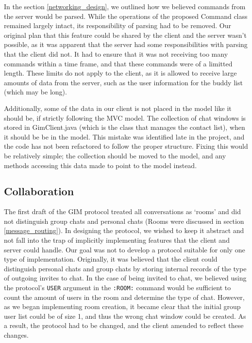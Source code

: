 In the section \ref{networking_design}, we outlined how we believed commands from the server would be parsed. While the operations of the proposed Command class remained largely intact, its responsibility of parsing had to be removed. Our original plan that this feature could be shared by the client and the server wasn't possible, as it was apparent that the server had some responsibilities with parsing that the client did not. It had to ensure that it was not receiving too many commands within a time frame, and that these commands were of a limitted length. These limits do not apply to the client, as it is allowed to receive large amounts of data from the server, such as the user information for the buddy list (which may be long).

Additionally, some of the data in our client is not placed in the model like it should be, if strictly following the MVC model. The collection of chat windows is stored in GimClient.java (which is the class that manages the contact list), when it should be be in the model. This mistake was identified late in the project, and the code has not been refactored to follow the proper structure. Fixing this would be relatively simple; the collection should be moved to the model, and any methods accessing this data made to point to the model instead.

\subsection{Collaboration}
\label{collab}

The first draft of the GIM protocol treated all conversations as `rooms' and did not distinguish group chats and personal chats (Rooms were discussed in section \ref{message_routing}). In designing the protocol, we wished to keep it abstract and not fall into the trap of implicitly implementing features that the client and server could handle. Our goal was not to develop a protocol suitable for only one type of implementation. Originally, it was believed that the client could distinguish personal chats and group chats by storing internal records of the type of outgoing invites to chat. In the case of being invited to chat, we believed using the protocol's \texttt{USER} argument in the \texttt{:ROOM:} command would be sufficient to count the amount of users in the room and determine the type of chat. However, as we began implementing room creation, it became clear that the initial group user list could be of size 1, and thus the wrong chat window could be created. As a result, the protocol had to be changed, and the client amended to reflect these changes. 

